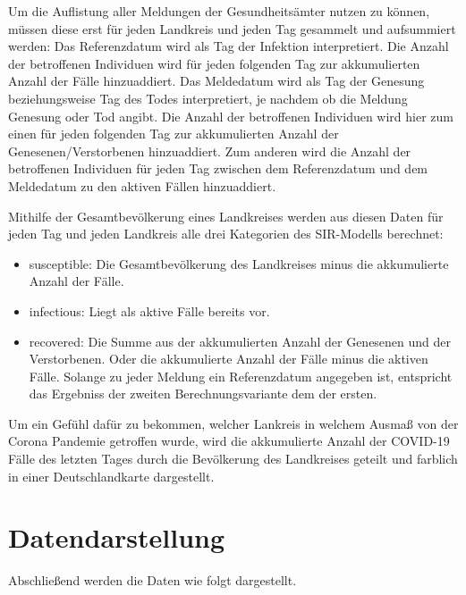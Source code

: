 Um die Auflistung aller Meldungen der Gesundheitsämter nutzen zu können, müssen diese erst für jeden Landkreis und jeden Tag gesammelt und aufsummiert werden:
Das Referenzdatum wird als Tag der Infektion interpretiert. Die Anzahl der betroffenen Individuen wird für jeden folgenden Tag zur akkumulierten Anzahl der Fälle hinzuaddiert.
Das Meldedatum wird als Tag der Genesung beziehungsweise Tag des Todes interpretiert, je nachdem ob die Meldung Genesung oder Tod angibt. Die Anzahl der betroffenen Individuen wird hier zum einen für jeden folgenden Tag zur akkumulierten Anzahl der Genesenen/Verstorbenen hinzuaddiert. Zum anderen wird die Anzahl der betroffenen Individuen für jeden Tag zwischen dem Referenzdatum und dem Meldedatum zu den aktiven Fällen hinzuaddiert.

Mithilfe der Gesamtbevölkerung eines Landkreises werden aus diesen Daten für jeden Tag und jeden Landkreis alle drei Kategorien des SIR-Modells berechnet:

\begin{itemize}
    \item \glqq{}susceptible\grqq{}: Die Gesamtbevölkerung des Landkreises minus die akkumulierte Anzahl der Fälle.
    \item \glqq{}infectious\grqq{}: Liegt als aktive Fälle bereits vor.
    \item \glqq{}recovered\grqq{}:
    Die Summe aus der akkumulierten Anzahl der Genesenen und der Verstorbenen. Oder die akkumulierte Anzahl der Fälle minus die aktiven Fälle. Solange zu jeder Meldung ein Referenzdatum angegeben ist, entspricht das Ergebniss der zweiten Berechnungsvariante dem der ersten.
\end{itemize}

Um ein Gefühl dafür zu bekommen, welcher Lankreis in welchem Ausmaß von der Corona Pandemie getroffen wurde, wird die akkumulierte Anzahl der COVID-19 Fälle des letzten Tages durch die Bevölkerung des Landkreises geteilt und farblich in einer Deutschlandkarte dargestellt.
%
\section{Datendarstellung}
Abschließend werden die Daten wie folgt dargestellt.
